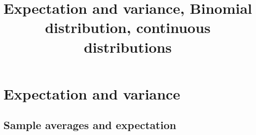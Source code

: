 


\title{Expectation and variance, Binomial distribution, continuous distributions}

\maketitle
\tableofcontents





\section{Expectation and  variance}




\subsection{Sample averages and expectation  \cite[Ch. 3]{tabak}}
